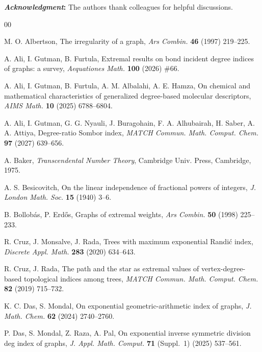 \documentclass[a5paper, 10pt]{article}
\theoremstyle{plain}
\theoremstyle{remark}
\theoremstyle{definition}
\newcommand{\acknowledgment}[1]{\vspace{5mm}\singlespacing
	{\noindent\textbf{\textit{Acknowledgment\/}:} #1}
}
\begin{document}
\acknowledgment{The authors thank colleagues for helpful discussions.}

\singlespacing

 \begin{thebibliography}{00}

     M. O. Albertson, The irregularity of a graph,
  \textit{Ars Combin.\/} \textbf{46} (1997) 219--225.

   A. Ali, I. Gutman, B. Furtula,
  Extremal results on bond incident degree indices of graphs: a survey,
  \textit{Aequationes Math.\/} \textbf{100} (2026) \#66.

   A. Ali, I. Gutman,
  B. Furtula, A. M. Albalahi, A. E. Hamza, On chemical and mathematical
  characteristics of generalized degree-based molecular descriptors,
  \textit{AIMS Math.\/} \textbf{10} (2025) 6788--6804.

   A. Ali, I. Gutman, G. G. Nyauli, J. Buragohain,
  F. A. Alhubairah, H. Saber, A. A. Attiya, Degree-ratio Sombor index,
  \textit{MATCH Commun. Math. Comput. Chem.\/} \textbf{97} (2027) 639--656.

   A. Baker, \textit{Transcendental Number Theory\/},
  Cambridge Univ. Press, Cambridge, 1975.

   A. S. Besicovitch, On the linear independence
  of fractional powers of integers, \textit{J. London Math. Soc.\/}
  \textbf{15} (1940) 3--6.

  B. Bollob\'as, P. Erd\H{o}s, Graphs of extremal weights, \textit{Ars Combin.\/}
  \textbf{50} (1998) 225--233.

   R. Cruz, J. Monsalve, J. Rada, Trees with
  maximum exponential Randi\'c index, \textit{Discrete Appl. Math.\/}
  \textbf{283} (2020) 634--643.

   R. Cruz, J. Rada, The path and the star as
  extremal values of vertex-degree-based topological indices among trees,
  \textit{MATCH Commun. Math. Comput. Chem.\/} \textbf{82} (2019) 715--732.

   K. C. Das, S. Mondal, On exponential
  geometric-arithmetic index of graphs, \textit{J. Math. Chem.\/}
  \textbf{62} (2024) 2740--2760.

   P. Das, S. Mondal, Z. Raza,
  A. Pal, On exponential inverse symmetric division deg index of graphs,
  \textit{J. Appl. Math. Comput.\/} \textbf{71} (Suppl.~1) (2025) 537--561.


\end{thebibliography}
\end{document}
